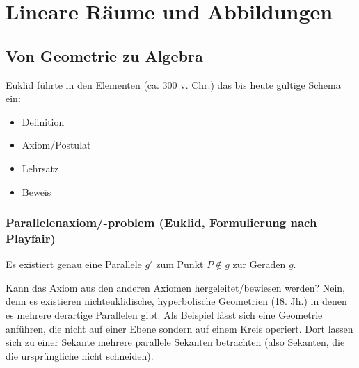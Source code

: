\chapter{Lineare Räume und Abbildungen}
\section{Von Geometrie zu Algebra}
 Euklid führte in den \glqq Elementen\grqq{} (ca. 300 v. Chr.) das bis heute gültige Schema ein:
 \begin{itemize}
 	\item Definition
 	\item Axiom/Postulat
 	\item Lehrsatz
 	\item Beweis
 \end{itemize}

 \subsection{Parallelenaxiom/-problem (Euklid, Formulierung nach Playfair)}
 	Es existiert genau eine Parallele $ g' $ zum Punkt $ P \notin g $ zur Geraden $ g $.

 	Kann das Axiom aus den anderen Axiomen hergeleitet/bewiesen werden? Nein, denn es existieren nichteuklidische, hyperbolische Geometrien (18. Jh.) in denen es mehrere derartige Parallelen gibt. Als Beispiel lässt sich eine Geometrie anführen, die nicht auf einer Ebene sondern auf einem Kreis operiert. Dort lassen sich zu einer Sekante mehrere parallele Sekanten betrachten (also Sekanten, die die ursprüngliche nicht schneiden).

